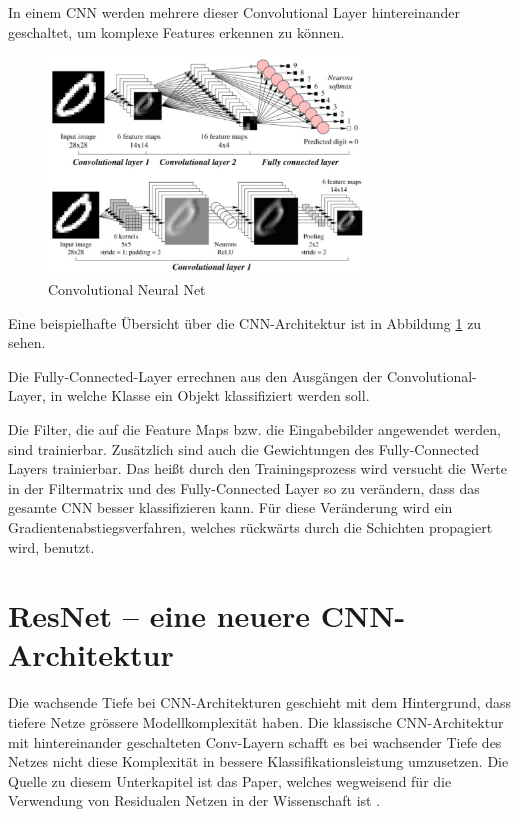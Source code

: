 In einem CNN werden mehrere dieser Convolutional Layer hintereinander geschaltet, um komplexe Features erkennen zu können. 
\begin{figure}[H]
  \centering
  \includegraphics[width=0.75\textwidth]{images/cnn.pdf}
  \caption{Convolutional Neural Net \cite{CNNImg}}
  \label{fig:cnn}
\end{figure}



Eine beispielhafte Übersicht über die CNN-Architektur ist in Abbildung \ref{fig:cnn} zu sehen.

Die Fully-Connected-Layer errechnen aus den Ausgängen der Convolutional-Layer, in welche Klasse ein Objekt klassifiziert werden soll.  

Die Filter, die auf die Feature Maps bzw. die Eingabebilder angewendet werden, sind trainierbar. Zusätzlich sind auch die Gewichtungen des Fully-Connected Layers trainierbar. Das heißt durch den Trainingsprozess wird versucht die Werte in der Filtermatrix und des Fully-Connected Layer so zu verändern, dass das gesamte CNN besser klassifizieren kann. Für diese Veränderung wird ein Gradientenabstiegsverfahren, welches rückwärts durch die Schichten propagiert wird, benutzt.


\section{ResNet -- eine neuere CNN-Architektur}
Die wachsende Tiefe bei CNN-Architekturen geschieht mit dem Hintergrund, dass tiefere Netze grössere Modellkomplexität haben. Die klassische CNN-Architektur mit hintereinander geschalteten Conv-Layern schafft es bei wachsender Tiefe des Netzes nicht diese Komplexität in bessere Klassifikationsleistung umzusetzen. Die Quelle zu diesem Unterkapitel ist das Paper, welches wegweisend für die Verwendung von Residualen Netzen in der Wissenschaft ist \cite{resnet}.


